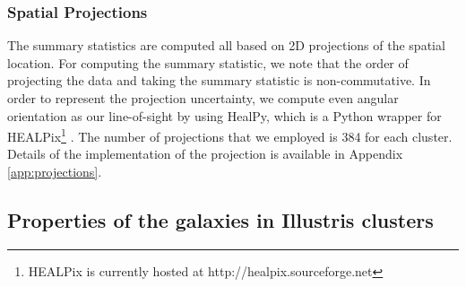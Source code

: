 \subsubsection{Spatial Projections}
\label{subsubsec:projections}
The summary statistics are computed all based on 2D projections of the
spatial location.
For computing the summary statistic, we note that 
the order of projecting the data and taking the summary statistic is
non-commutative.  
In order to represent the projection uncertainty, we compute even angular
orientation as our line-of-sight
by using HealPy, which is a Python wrapper for HEALPix\footnote{HEALPix is
currently hosted at http://healpix.sourceforge.net}
\citep{Gorski2005}. 
The number of projections that we employed is 384 for each cluster.
Details of the implementation of the projection is available in Appendix
\ref{app:projections}.


\subsection{Properties of the galaxies in Illustris clusters}
\label{subsec:galaxy_properties}

